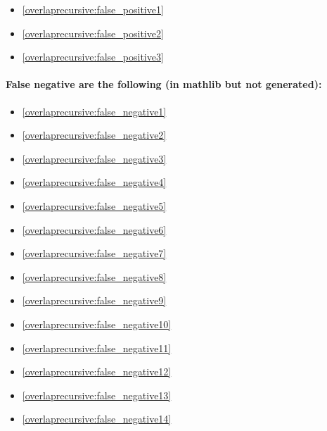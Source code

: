 \begin{multicols}{2}
\begin{itemize}[noitemsep]
    \item \cref{overlaprecursive:false_positive1}
    \item \cref{overlaprecursive:false_positive2}
    \item \cref{overlaprecursive:false_positive3}
\end{itemize}
\end{multicols}

\vspace{-0.6cm}
\paragraph*{False negative are the following (in mathlib but not generated):}

\begin{multicols}{2}
\begin{itemize}[noitemsep]
    \item \cref{overlaprecursive:false_negative1}
    \item \cref{overlaprecursive:false_negative2}
    \item \cref{overlaprecursive:false_negative3}
    \item \cref{overlaprecursive:false_negative4}
    \item \cref{overlaprecursive:false_negative5}
    \item \cref{overlaprecursive:false_negative6}
    \item \cref{overlaprecursive:false_negative7}
    \item \cref{overlaprecursive:false_negative8}
    \item \cref{overlaprecursive:false_negative9}
    \item \cref{overlaprecursive:false_negative10}
    \item \cref{overlaprecursive:false_negative11}
    \item \cref{overlaprecursive:false_negative12}
    \item \cref{overlaprecursive:false_negative13}
    \item \cref{overlaprecursive:false_negative14}
\end{itemize}
\end{multicols}

\vspace{-1.4cm}

